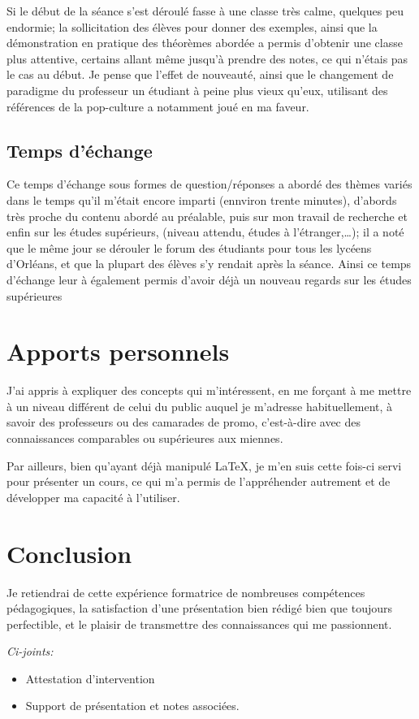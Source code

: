 \documentclass[12pt]{article}
\begin{document}
Si le début de la séance s'est déroulé fasse à une classe très calme,  quelques peu endormie; la sollicitation des élèves pour donner des exemples, ainsi que la démonstration en pratique des théorèmes abordée a permis d'obtenir une classe plus attentive, certains allant même jusqu'à prendre des notes, ce qui n'étais pas le cas au début. Je pense que l'effet de nouveauté, ainsi que le changement de paradigme du professeur un étudiant à peine plus vieux qu'eux, utilisant des références de la pop-culture a notamment joué en ma faveur.

\subsection{Temps d'échange}

 Ce temps d'échange sous formes de question/réponses a abordé des thèmes variés dans le temps qu'il m'était encore imparti (ennviron trente minutes), d'abords très proche du contenu abordé au préalable, puis sur mon travail de recherche et enfin sur les études supérieurs, (niveau attendu, études à l'étranger,\ldots); il a noté que le même jour se dérouler le forum des étudiants pour tous les lycéens d'Orléans, et que la plupart des élèves s'y rendait après la séance. Ainsi ce temps d'échange leur à également permis d'avoir déjà un nouveau regards sur les études supérieures

 \section{Apports personnels}
J'ai appris à expliquer des concepts qui m'intéressent, en me forçant à me mettre à un niveau différent de celui du public auquel je m'adresse habituellement, à savoir des professeurs ou des camarades de promo, c'est-à-dire avec des connaissances
comparables ou supérieures aux miennes.

Par ailleurs, bien qu'ayant déjà manipulé \LaTeX, je m'en suis cette fois-ci servi pour présenter un cours, ce qui m'a permis de l'appréhender autrement et de développer ma capacité à l'utiliser.


 \section{Conclusion}

 Je retiendrai de cette expérience formatrice de nombreuses compétences pédagogiques, la satisfaction d'une présentation bien rédigé bien que toujours perfectible, et le plaisir de transmettre des connaissances qui me passionnent.\\[2em]
{\it
 Ci-joints:
 \begin{itemize}
   \item Attestation d'intervention
   \item Support de présentation et notes associées.
 \end{itemize}
 }
\end{document}
